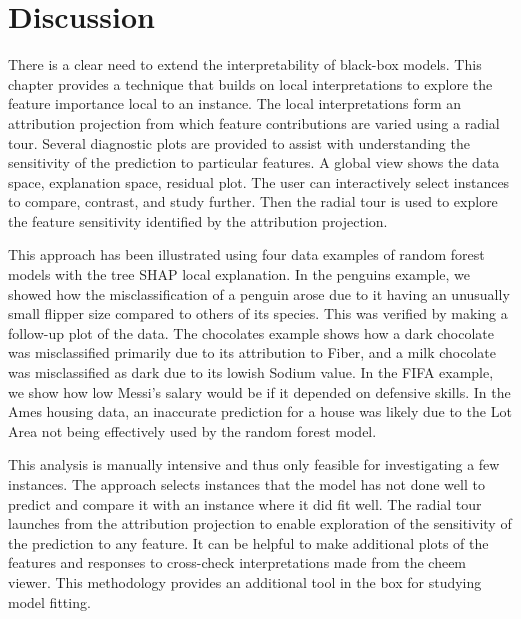 \documentclass[
]{article}
\begin{document}
\hypertarget{sec:cheemdiscussion}{%
\section{Discussion}\label{sec:cheemdiscussion}}

There is a clear need to extend the interpretability of black-box models. This chapter provides a technique that builds on local interpretations to explore the feature importance local to an instance. The local interpretations form an attribution projection from which feature contributions are varied using a radial tour. Several diagnostic plots are provided to assist with understanding the sensitivity of the prediction to particular features. A global view shows the data space, explanation space, residual plot. The user can interactively select instances to compare, contrast, and study further. Then the radial tour is used to explore the feature sensitivity identified by the attribution projection.

This approach has been illustrated using four data examples of random forest models with the tree SHAP local explanation. In the penguins example, we showed how the misclassification of a penguin arose due to it having an unusually small flipper size compared to others of its species. This was verified by making a follow-up plot of the data. The chocolates example shows how a dark chocolate was misclassified primarily due to its attribution to Fiber, and a milk chocolate was misclassified as dark due to its lowish Sodium value. In the FIFA example, we show how low Messi's salary would be if it depended on defensive skills. In the Ames housing data, an inaccurate prediction for a house was likely due to the Lot Area not being effectively used by the random forest model.

This analysis is manually intensive and thus only feasible for investigating a few instances. The approach selects instances that the model has not done well to predict and compare it with an instance where it did fit well. The radial tour launches from the attribution projection to enable exploration of the sensitivity of the prediction to any feature. It can be helpful to make additional plots of the features and responses to cross-check interpretations made from the cheem viewer. This methodology provides an additional tool in the box for studying model fitting.
\end{document}

